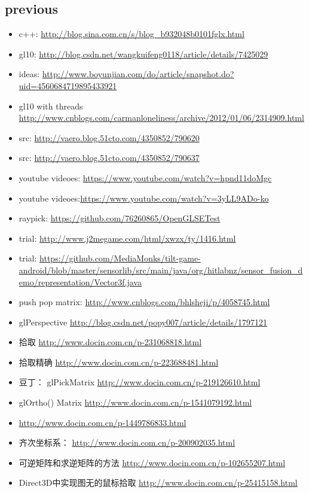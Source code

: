 \documentclass[9pt,b5paper]{article}
\begin{document}
\subsection{previous}
\label{sec-2-3}
\begin{itemize}
\item c++: \url{http://blog.sina.com.cn/s/blog_b932048b0101fglx.html}
\item gl10: \url{http://blog.csdn.net/wangkuifeng0118/article/details/7425029}
\item ideas: \url{http://www.boyunjian.com/do/article/snapshot.do?uid=4560684719895433921}
\item gl10 with threads \url{http://www.cnblogs.com/carmanloneliness/archive/2012/01/06/2314909.html}
\item src: \url{http://vaero.blog.51cto.com/4350852/790620}
\item src: \url{http://vaero.blog.51cto.com/4350852/790637}
\item youtube videoes: \url{https://www.youtube.com/watch?v=hpnd11doMgc}
\item youtube videoes:\url{https://www.youtube.com/watch?v=3yLL9ADo-ko}
\item raypick: \url{https://github.com/76260865/OpenGLSETest}
\item trial: \url{http://www.j2megame.com/html/xwzx/ty/1416.html}
\item trial: \url{https://github.com/MediaMonks/tilt-game-android/blob/master/sensorlib/src/main/java/org/hitlabnz/sensor_fusion_demo/representation/Vector3f.java}
\item push pop matrix: \url{http://www.cnblogs.com/bhlsheji/p/4058745.html}
\item glPerspective \url{http://blog.csdn.net/popy007/article/details/1797121}
\item 拾取 \url{http://www.docin.com.cn/p-231068818.html}
\item 拾取精确 \url{http://www.docin.com.cn/p-223688481.html}
\item 豆丁： glPickMatrix \url{http://www.docin.com.cn/p-219126610.html}
\item glOrtho() Matrix \url{http://www.docin.com.cn/p-1541079192.html}
\item \url{http://www.docin.com.cn/p-1449786833.html}
\item 齐次坐标系： \url{http://www.docin.com.cn/p-200902035.html}
\item 可逆矩阵和求逆矩阵的方法 \url{http://www.docin.com.cn/p-102655207.html}
\item Direct3D中实现图无的鼠标拾取 \url{http://www.docin.com.cn/p-25415158.html}

\end{itemize}
\end{document}
